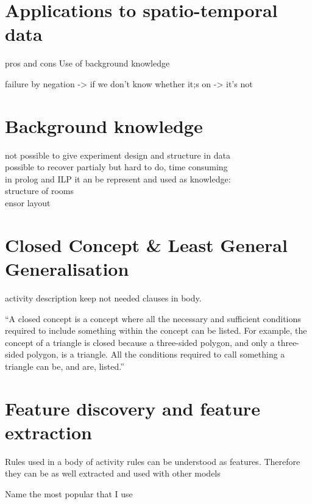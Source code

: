 \documentclass[12pt, a4paper, pdflatex, leqno, twoside, openright]{report}
\begin{document}
  \section{Applications to spatio-temporal data}
pros and cons Use of background knowledge

failure by negation -> if we don't know whether it;s on -> it's not

  \section{Background knowledge}
not possible to give experiment design and structure in data\\
possible to recover partialy but hard to do, time consuming\\

in prolog and ILP it an be represent and used as knowledge:\\
structure of rooms\\
ensor layout\\

  \section{Closed Concept \& Least General Generalisation}
activity description
keep not needed clauses in body.

``A closed concept is a concept where all the necessary and sufficient conditions required to include something within the concept can be listed. For example, the concept of a triangle is closed because a three-sided polygon, and only a three-sided polygon, is a triangle. All the conditions required to call something a triangle can be, and are, listed.''

  \section{Feature discovery and feature extraction}
Rules used in a body of activity rules can be understood as features.
Therefore they can be as well extracted and used with other models

Name the most popular that I use


\end{document}
